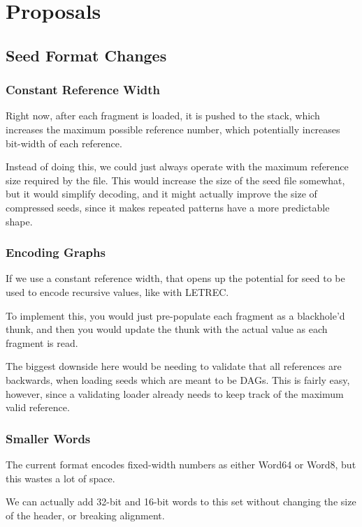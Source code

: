 \section{Proposals}

\subsection{Seed Format Changes}

\subsubsection{Constant Reference Width}

Right now, after each fragment is loaded, it is pushed to the stack,
which increases the maximum possible reference number, which potentially
increases bit-width of each reference.

Instead of doing this, we could just always operate with the maximum
reference size required by the file.  This would increase the size of
the seed file somewhat, but it would simplify decoding, and it might
actually improve the size of compressed seeds, since it makes repeated
patterns have a more predictable shape.

\subsubsection{Encoding Graphs}

If we use a constant reference width, that opens up the potential
for seed to be used to encode recursive values, like with LETREC.

To implement this, you would just pre-populate each fragment as a
blackhole'd thunk, and then you would update the thunk with the actual
value as each fragment is read.

The biggest downside here would be needing to validate that all references
are backwards, when loading seeds which are meant to be DAGs.  This is
fairly easy, however, since a validating loader already needs to keep
track of the maximum valid reference.

\subsubsection{Smaller Words}

The current format encodes fixed-width numbers as either Word64 or Word8,
but this wastes a lot of space.

We can actually add 32-bit and 16-bit words to this set without changing
the size of the header, or breaking alignment.

